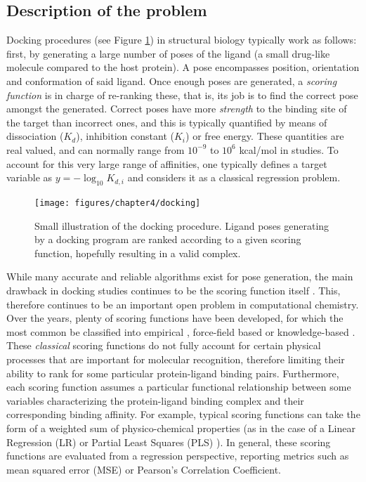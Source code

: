 \documentclass[10pt,a4paper,twoside]{book}
\begin{document}
\subsection{Description of the problem}

Docking procedures (see Figure \ref{fig:docking}) in structural biology typically work as follows: first, by generating a large number of poses of the ligand (a small drug-like molecule compared to the host protein). A pose encompasses position, orientation and conformation of said ligand. Once enough poses are generated, a \textit{scoring function} is in charge of re-ranking these, that is, its job is to find the correct pose amongst the generated. Correct poses have more \textit{strength} to the binding site of the target than incorrect ones, and this is typically quantified by means of dissociation ($K_d$), inhibition constant ($K_i$) or free energy. These quantities are real valued, and can normally range from $10^{-9}$ to $10^6$ kcal/mol in studies. To account for this very large range of affinities, one typically defines a target variable as $y=-\log_{10}K_{d,i}$ and considers it as a classical regression problem.\\

\begin{figure}
\centering
\caption{Small illustration of the docking procedure. Ligand poses generating by a docking program are ranked according to a given scoring function, hopefully resulting in a valid complex.}
\texttt{[image: figures/chapter4/docking]}
\label{fig:docking}
\end{figure}

While many accurate and reliable algorithms exist for pose generation, the main drawback in docking studies continues to be the scoring function itself \cite{Leach2006}. This, therefore continues to be an important open problem in computational chemistry. Over the years, plenty of scoring functions have been developed, for which the most common be classified into empirical \cite{Friesner2004, Krammer2005}, force-field based \cite{Huang2006} or knowledge-based \cite{Mooij2005, Gohlke2000}. These \textit{classical} scoring functions do not fully account for certain physical processes that are important for molecular recognition, therefore limiting their ability to rank for some particular protein-ligand binding pairs. Furthermore, each scoring function assumes a particular functional relationship between some variables characterizing the protein-ligand binding complex and their corresponding binding affinity. For example, typical scoring functions can take the form of a weighted sum of physico-chemical properties (as in the case of a Linear Regression (LR) or Partial Least Squares (PLS) \cite{Abdi2003}). In general, these scoring functions are evaluated from a regression perspective, reporting metrics such as mean squared error (MSE) or Pearson's Correlation Coefficient. \\
\end{document}
